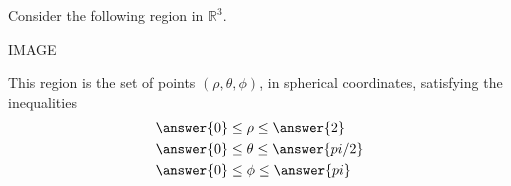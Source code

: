 \begin{problem}
Consider the following region in $\mathbb{R}^3$.

IMAGE

This region is the set of points $(\rho,\theta,\phi)$, in spherical coordinates, satisfying the inequalities
\begin{align*}
&\answer{0}\leq\rho\leq \answer{2}\\
&\answer{0}\leq\theta\leq\answer{pi/2}\\
&\answer{0}\leq\phi\leq\answer{pi}
\end{align*}

\end{problem}